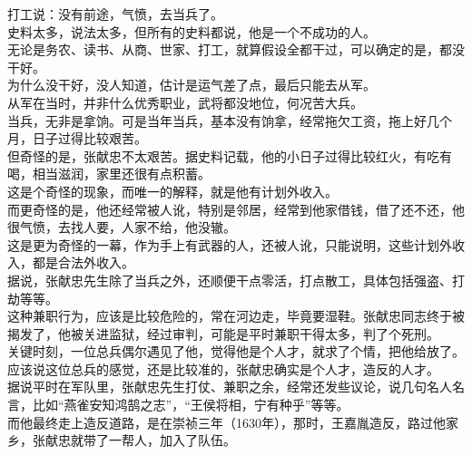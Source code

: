 \begin{multicols}{\theparacolNo}
打工说：没有前途，气愤，去当兵了。\\

史料太多，说法太多，但所有的史料都说，他是一个不成功的人。\\

无论是务农、读书、从商、世家、打工，就算假设全都干过，可以确定的是，都没干好。\\

为什么没干好，没人知道，估计是运气差了点，最后只能去从军。\\

从军在当时，并非什么优秀职业，武将都没地位，何况苦大兵。\\

当兵，无非是拿饷。可是当年当兵，基本没有饷拿，经常拖欠工资，拖上好几个月，日子过得比较艰苦。\\

但奇怪的是，张献忠不太艰苦。据史料记载，他的小日子过得比较红火，有吃有喝，相当滋润，家里还很有点积蓄。\\

这是个奇怪的现象，而唯一的解释，就是他有计划外收入。\\

而更奇怪的是，他还经常被人讹，特别是邻居，经常到他家借钱，借了还不还，他很气愤，去找人要，人家不给，他没辙。\\

这是更为奇怪的一幕，作为手上有武器的人，还被人讹，只能说明，这些计划外收入，都是合法外收入。\\

据说，张献忠先生除了当兵之外，还顺便干点零活，打点散工，具体包括强盗、打劫等等。\\

这种兼职行为，应该是比较危险的，常在河边走，毕竟要湿鞋。张献忠同志终于被揭发了，他被关进监狱，经过审判，可能是平时兼职干得太多，判了个死刑。\\

关键时刻，一位总兵偶尔遇见了他，觉得他是个人才，就求了个情，把他给放了。\\

应该说这位总兵的感觉，还是比较准的，张献忠确实是个人才，造反的人才。\\

据说平时在军队里，张献忠先生打仗、兼职之余，经常还发些议论，说几句名人名言，比如“燕雀安知鸿鹄之志”，“王侯将相，宁有种乎”等等。\\

而他最终走上造反道路，是在崇祯三年（1630年），那时，王嘉胤造反，路过他家乡，张献忠就带了一帮人，加入了队伍。\\


\end{multicols}
